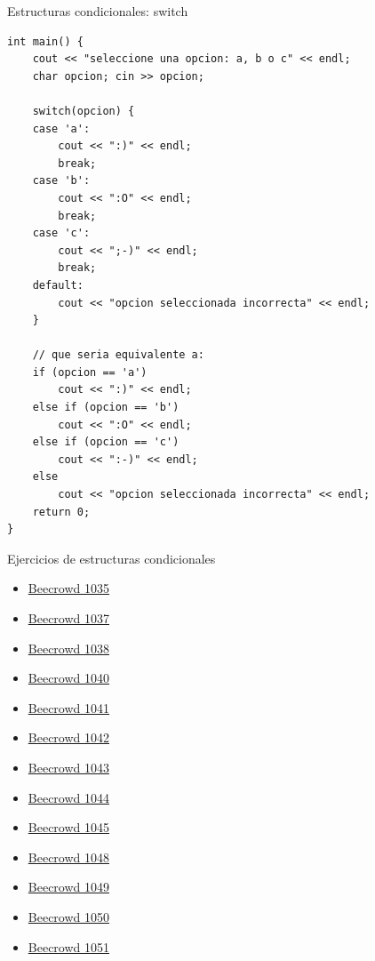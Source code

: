 \documentclass[12pt]{beamer}
\begin{document}
\begin{frame}[fragile]{Estructuras condicionales: switch}
\begin{lstlisting}[basicstyle=\tiny]
int main() {
    cout << "seleccione una opcion: a, b o c" << endl;
    char opcion; cin >> opcion;

    switch(opcion) {
    case 'a': 
        cout << ":)" << endl;
        break;
    case 'b':
        cout << ":O" << endl;
        break;
    case 'c':
        cout << ";-)" << endl;
        break;
    default:
        cout << "opcion seleccionada incorrecta" << endl;
    }

    // que seria equivalente a:
    if (opcion == 'a')
        cout << ":)" << endl;
    else if (opcion == 'b')
        cout << ":O" << endl;
    else if (opcion == 'c')
        cout << ":-)" << endl;
    else
        cout << "opcion seleccionada incorrecta" << endl;
    return 0;
}
\end{lstlisting}
\end{frame}

\begin{frame}{Ejercicios de estructuras condicionales}
    \begin{multicols}{2}
        \begin{itemize}
            \item \href{https://judge.beecrowd.com/es/problems/view/1035}{Beecrowd 1035}
            \item \href{https://judge.beecrowd.com/es/problems/view/1037}{Beecrowd 1037}
            \item \href{https://judge.beecrowd.com/es/problems/view/1038}{Beecrowd 1038}
            \item \href{https://judge.beecrowd.com/es/problems/view/1040}{Beecrowd 1040}
            \item \href{https://judge.beecrowd.com/es/problems/view/1041}{Beecrowd 1041}
            \item \href{https://judge.beecrowd.com/es/problems/view/1042}{Beecrowd 1042}
            \item \href{https://judge.beecrowd.com/es/problems/view/1043}{Beecrowd 1043}
            \item \href{https://judge.beecrowd.com/es/problems/view/1044}{Beecrowd 1044}
            \item \href{https://judge.beecrowd.com/es/problems/view/1045}{Beecrowd 1045}
            \item \href{https://judge.beecrowd.com/es/problems/view/1048}{Beecrowd 1048}
            \item \href{https://judge.beecrowd.com/es/problems/view/1049}{Beecrowd 1049}
            \item \href{https://judge.beecrowd.com/es/problems/view/1050}{Beecrowd 1050}
            \item \href{https://judge.beecrowd.com/es/problems/view/1051}{Beecrowd 1051}
        \end{itemize}
    \end{multicols}
\end{frame}
\end{document}
